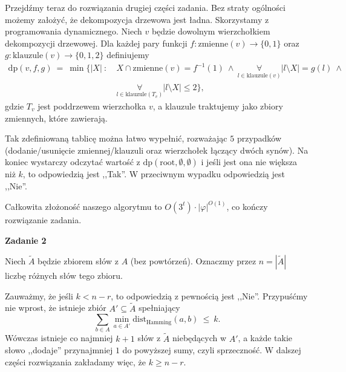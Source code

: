 \documentclass[12pt]{article}
\begin{document}
	\medskip
	
	Przejdźmy teraz do rozwiązania drugiej części zadania. Bez straty ogólności
	możemy założyć, że dekompozycja drzewowa jest ładna. Skorzystamy z
	programowania dynamicznego. Niech \(v\) będzie dowolnym wierzchołkiem
	dekompozycji drzewowej. Dla każdej pary funkcji \(f : \text{zmienne}(v) \to
	\{0, 1\}\) oraz \(g : \text{klauzule}(v) \to \{0, 1, 2\}\) definiujemy
	\begin{align*}
		\text{dp}(v, f, g) \ = \ \min \bigg\{ |X| \ : \ &X \cap
		\text{zmienne}(v) = f^{-1}(1) \ \wedge \ \underset{l \in
		\text{klauzule}(v)}{\forall} |l	\setminus X| = g(l) \ \wedge \\
		&\underset{l \in \text{klauzule}(T_{v})}{\forall} |l \setminus X|
		\leqslant 2 \bigg\} \text{,}
	\end{align*}
	gdzie \(T_{v}\) jest poddrzewem wierzchołka \(v\), a klauzule traktujemy
	jako zbiory zmiennych, które zawierają.
	
	\medskip
	
	Tak zdefiniowaną tablicę można łatwo wypełnić, rozważając \(5\) przypadków
	(dodanie/usunięcie zmiennej/klauzuli oraz wierzchołek łączący dwóch synów).
	Na koniec wystarczy odczytać wartość z \(\text{dp}(\text{root}, \emptyset,
	\emptyset)\) i jeśli jest ona nie większa niż \(k\), to odpowiedzią jest
	,,Tak''. W przeciwnym wypadku odpowiedzią jest ,,Nie''.
	
	\medskip
	
	Całkowita złożoność naszego algorytmu to \(O(3^{t}) \cdot
	|\varphi|^{O(1)}\), co kończy rozwiązanie zadania.
	
	\newpage
	
	\textbf{Zadanie 2}
	
	\medskip
	
	Niech \(\tilde{A}\) będzie zbiorem słów z \(A\) (bez powtórzeń). Oznaczmy
	przez \(n = |\tilde{A}|\) liczbę różnych słów tego zbioru.
	
	\medskip
	
	Zauważmy, że jeśli \(k < n - r\), to odpowiedzią z pewnością jest ,,Nie''.
	Przypuśćmy nie wprost, że istnieje zbiór \(A' \subseteq \tilde{A}\)
	spełniający
	\[ \sum\limits_{b \in A} \min_{a \in A'} \text{dist}_{\text{Hamming}} (a, b)
	\ \leqslant \ k \text{.} \]
	Wówczas istnieje co najmniej \(k + 1\) słów z \(\tilde{A}\) niebędących w
	\(A'\), a każde takie słowo ,,dodaje'' przynajmniej \(1\) do powyższej sumy,
	czyli sprzeczność. W dalszej części rozwiązania zakładamy więc, że \(k
	\geqslant n - r\).
	
\end{document}
